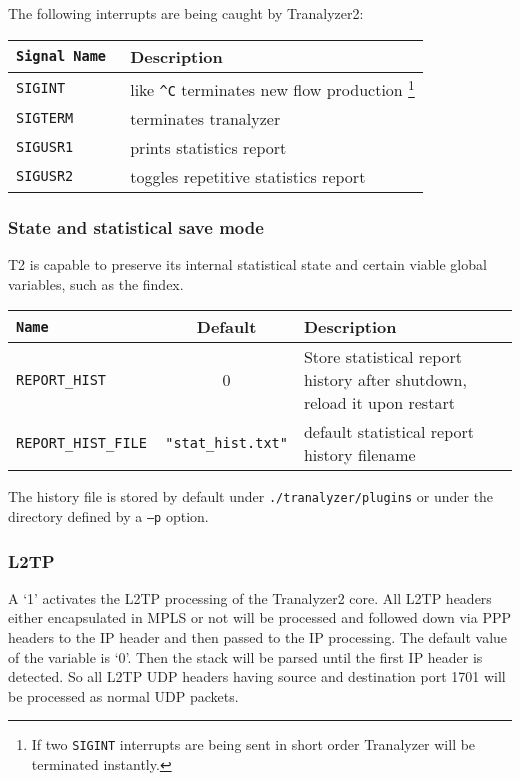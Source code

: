 The following interrupts are being caught by Tranalyzer2:

\begin{longtable}{>{\tt}ll}
    \toprule
    {\bf Signal Name} & {\bf Description}\\
    \midrule\endhead%
    SIGINT  & like {\tt\textasciicircum{}C} terminates new flow production%
              \footnote{If two {\tt SIGINT} interrupts are being sent in short order Tranalyzer will be terminated instantly.}\\
    SIGTERM & terminates tranalyzer \\
    SIGUSR1 & prints statistics report \\
    SIGUSR2 & toggles repetitive statistics report \\
    \bottomrule
\end{longtable}

\subsubsection{State and statistical save mode}
T2 is capable to preserve its internal statistical state and certain viable global variables, such as the findex.

\begin{longtable}{>{\tt\small}lcl}
    \toprule
    {\bf Name} & {\bf Default} & {\bf Description}\\
    \midrule\endhead%
    REPORT\_HIST       & 0                            & Store statistical report history after shutdown, reload it upon restart\\
    REPORT\_HIST\_FILE & {\tt\small "stat\_hist.txt"} & default statistical report history filename\\
    \bottomrule
\end{longtable}
The history file is stored by default under {\tt ./tranalyzer/plugins} or under the directory defined by a {\tt --p} option.

\subsubsection{L2TP}
A `1' activates the L2TP processing of the Tranalyzer2 core. All L2TP headers either encapsulated in MPLS or not will be processed and followed down via PPP headers to the IP header and then passed to the IP processing. The default value of the variable is `0'. Then the stack will be parsed until the first IP header is detected. So all L2TP UDP headers having source and destination port 1701 will be processed as normal UDP packets.

